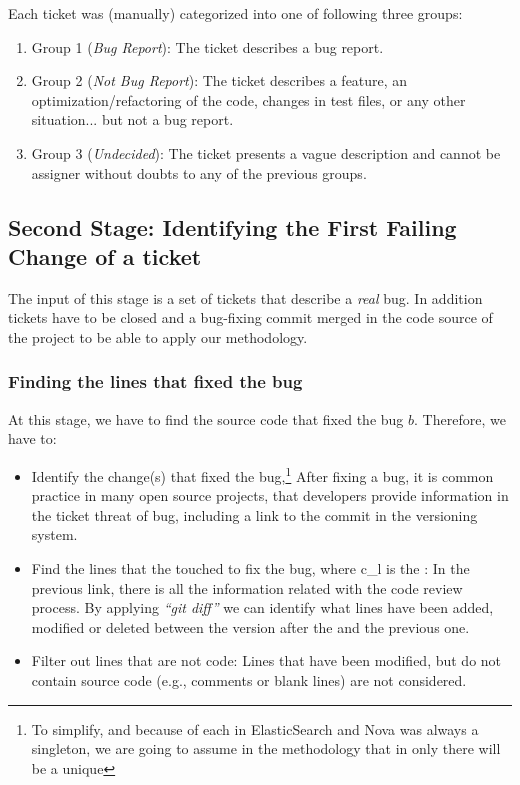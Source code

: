 \documentclass[a4paper, 12pt]{book}
\begin{document}
Each ticket was (manually) categorized into one of following three groups:

\begin{enumerate}
  \item Group 1 (\textit{Bug Report}): The ticket describes a bug report.
  \item Group 2 (\textit{Not Bug Report}): The ticket describes a feature, an optimization/refactoring of the code, changes in test files, or any other situation... but not a bug report.
  \item Group 3 (\textit{Undecided}): The ticket presents a vague description and cannot be assigner without doubts to any of the previous groups.
\end{enumerate}

\subsection{Second Stage: Identifying the First Failing Change of a ticket}
\label{sec:methodologySS}

The input of this stage is a set of tickets that describe a \emph{real} bug.
In addition tickets have to be closed and a bug-fixing commit merged in the code source of the project to be able to apply our methodology.

\subsubsection{Finding the lines that fixed the bug}

At this stage, we have to find the source code that fixed the bug $b$. Therefore, we have to:
	\begin{itemize}
		\item Identify the change(s) that fixed the bug,\footnote{To simplify, and because of each  in ElasticSearch and Nova was always a singleton, we are going to assume in the methodology that in  only there will be a unique \BFC}
		After fixing a bug, it is common practice in many open source projects, that developers provide information in the ticket threat of bug, including a link to the commit in the versioning system.
		\item Find the lines that the  touched to fix the bug,  where c\_l is the \BFC:
	In the previous link, there is all the information related with the code review process. By applying \textit{``git diff''} we can identify what lines have been added, modified or deleted between the version after the  and the previous one.
		\item Filter out lines that are not code:
		Lines that have been modified, but do not contain source code (e.g., comments or blank lines) are not considered.
	\end{itemize}
\end{document}
